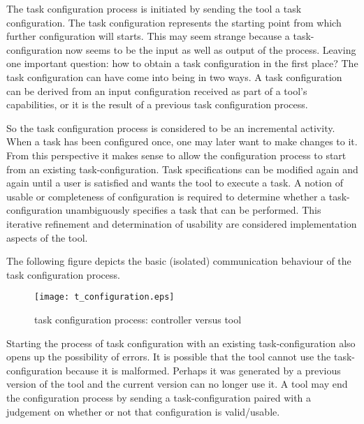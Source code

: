 \documentclass{article}
\begin{document}

   The task configuration process is initiated by sending the tool a task
   configuration. The task configuration represents the starting point from
   which further configuration will starts. This may seem strange because a
   task-configuration now seems to be the input as well as output of the
   process. Leaving one important question: how to obtain a task configuration
   in the first place?  The task configuration can have come into being in two
   ways.  A task configuration can be derived from an input configuration
   received as part of a tool's capabilities, or it is the result of a previous
   task configuration process.
   
   So the task configuration process is considered to be an incremental
   activity.  When a task has been configured once, one may later want to make
   changes to it. From this perspective it makes sense to allow the
   configuration process to start from an existing task-configuration. Task
   specifications can be modified again and again until a user is satisfied and
   wants the tool to execute a task. A notion of usable or completeness of
   configuration is required to determine whether a task-configuration
   unambiguously specifies a task that can be performed.  This iterative
   refinement and determination of usability are considered implementation
   aspects of the tool.

   The following figure depicts the basic (isolated) communication behaviour of
   the task configuration process.
   
   \begin{figure}[H]
    \begin{center}
     \texttt{[image: t\_configuration.eps]}
    \end{center}
    \vspace{-0.3cm}
    \caption{task configuration process: controller versus tool}
   \end{figure}

   \noindent Starting the process of task configuration with an existing
   task-configuration also opens up the possibility of errors. It is possible
   that the tool cannot use the task-configuration because it is malformed.
   Perhaps it was generated by a previous version of the tool and the current
   version can no longer use it. A tool may end the configuration process by
   sending a task-configuration paired with a judgement on whether or not that
   configuration is valid/usable.
\end{document}
